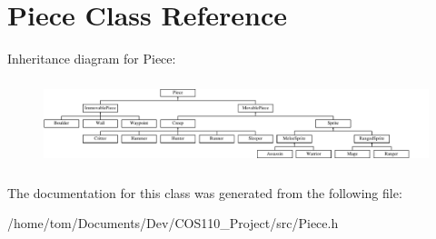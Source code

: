 \hypertarget{classPiece}{\section{Piece Class Reference}
\label{classPiece}
}
Inheritance diagram for Piece\-:\begin{figure}[H]
\begin{center}
\leavevmode
\includegraphics[height=2.522522cm]{classPiece}
\end{center}
\end{figure}


The documentation for this class was generated from the following file\-:\begin{DoxyCompactItemize}
\item 
/home/tom/\-Documents/\-Dev/\-C\-O\-S110\-\_\-\-Project/src/Piece.\-h\end{DoxyCompactItemize}
